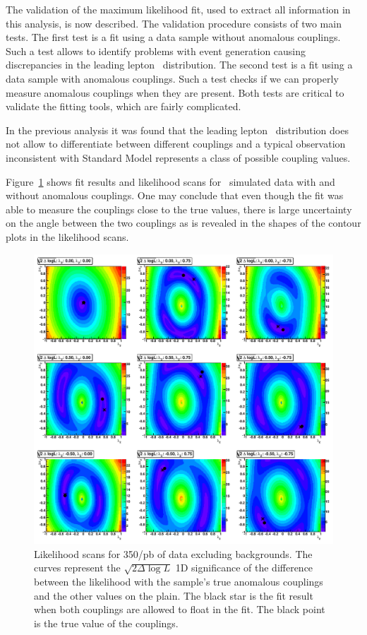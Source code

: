 The validation of the maximum likelihood fit, used to extract all information in this
analysis, is now described. The validation procedure consists of
two main tests. The first test is a fit using a data sample without
anomalous couplings. Such a test allows to identify problems with
event generation causing discrepancies in the leading lepton
\pt\ distribution. The second test is a fit using a data sample with
anomalous couplings. Such a test checks if we can properly measure
anomalous couplings when they are present. Both tests are critical to
validate the fitting tools, which are fairly complicated.

In the previous analysis it was found that the leading lepton
\pt\ distribution does not allow to differentiate between different
couplings and a typical observation inconsistent with Standard Model
represents a class of possible coupling values.

Figure~\ref{fig:val_scans} shows fit results and likelihood scans for
\ww\ simulated data with and without anomalous couplings. One may
conclude that even though the fit was able to measure the couplings
close to the true values, there is large uncertainty on the angle
between the two couplings as is revealed in the shapes of the contour
plots in the likelihood scans.

\begin{figure}[tp]
  \centerline{
    \includegraphics[width=1.0\textwidth]{figures/validation_likelihood_scans}
  }

  \caption[Likelihood scan for Signal Monte Carlo] {Likelihood scans
    for 350/pb of data excluding backgrounds. The curves
    represent the $\sqrt{2\Delta\log L}$ 1D significance of the difference between the
    likelihood with the sample's true anomalous couplings and the other
    values on the plain. The black star is the fit result when both couplings are
    allowed to float in the fit. The black point is the true value of the couplings.}
  \label{fig:val_scans}
\end{figure}

